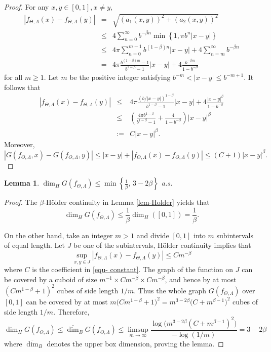 \documentclass[12pt, reqno]{amsart}
\theoremstyle{plain}
\newtheorem{lemma}{Lemma}[section]
\theoremstyle{definition}
\theoremstyle{remark}
\begin{document}
	\begin{proof}
		For any \( x, y \in [0,1], x\ne  y\),
		\begin{eqnarray*}
				|f_{\Theta,\Lambda}(x) -f_{\Theta,\Lambda}(y)| &=& \sqrt{(a_1(x,y))^2+(a_2(x,y))^2} \\				 
				&\leq& 4 \sum_{n=0}^{\infty}  b^{-\beta n} \min\left\{1, \pi b^n |x - y|\right\} \\
				&\leq& 4  \pi \sum_{n=0}^{m-1} b^{(1-\beta) n} |x - y| + 4 \sum_{n=m}^{\infty} b^{-\beta n} \\
				&=& 4\pi \frac{b^{(1-\beta) m} - 1}{b^{1-\beta} - 1} |x - y| + 4 \frac{b^{-\beta m}}{1 - b^{-\beta}}
		\end{eqnarray*}
		for all \( m \ge 1 \).  Let \( m \) be the positive integer satisfying \( b^{-m} < |x - y| \leq b^{-m+1} \). It follows that
		\begin{eqnarray}\label{equ- constant}
			|f_{\Theta,\Lambda}(x) -f_{\Theta,\Lambda}(y)| &\leq& 4\pi \frac{(b / |x - y|)^{1-\beta}}{b^{1-\beta} - 1} |x - y| + 4\frac{|x - y|^{\beta}}{1 - b^{-\beta}} \nonumber \\
				&\leq& \left( \frac{4\pi b^{1-\beta}}{b^{1-\beta} - 1} + \frac{4}{1 - b^{-\beta}} \right) |x - y|^{\beta} \nonumber \\
				&:=& C |x - y|^{\beta}. 
		\end{eqnarray}		
		Moreover, $$|G(f_{\Theta,\Lambda},x)-G(f_{\Theta,\Lambda},y)|\le|x-y|+|f_{\Theta,\Lambda}(x) -f_{\Theta,\Lambda}(y)|\le (C+1)|x-y|^\beta.$$		
	\end{proof}
	

	
	\begin{lemma}\label{lem-lowerbound}
		$\dim_H G(f_{\Theta,\Lambda})\le \min\left\{\frac{1}{\beta}, \, 3-2\beta\right\}$ a.s.
	\end{lemma}
	
	\begin{proof}
	The $\beta$-H\"older continuity in	Lemma \ref{lem-Holder} yields that 
	$$\dim_H G(f_{\Theta,\Lambda})\le \frac{1}{\beta} \dim_H([0,1])=\frac{1}{\beta}.$$
		
	On the other hand,	take an integer \( m>1 \) and divide \( [0,1] \) into \( m \) subintervals of equal length. Let $J$ be one of the subintervals, H\"older continuity implies that
		\[
		\sup_{x,y\in J}|f_{\Theta,\Lambda}(x)-f_{\Theta,\Lambda}(y)| \le C m^{-\beta}
		\] where $C$ is the coefficient in \eqref{equ- constant}. 	The graph of the function on $J$ can be covered by a cuboid of size
		\( m^{-1}\times C m^{-\beta}\times C m^{-\beta} \), and hence by at most $(C m^{1-\beta} + 1)^2$ cubes of side length \( 1/m \). Thus the whole graph  $G(f_{\Theta,\Lambda})$ over $[0,1]$ can be covered by at most $m\bigl(C m^{1-\beta}+1\bigr)^2=m^{3-2\beta}\bigl(C+m^{\beta-1}\bigr)^2$
		cubes of side length \( 1/m \). Therefore,
		\[
		\dim_H G(f_{\Theta,\Lambda})
		\le \overline{\dim}_B G(f_{\Theta,\Lambda})
		\le \limsup_{m\to\infty}
		\frac{\log\bigl(m^{3-2\beta}(C+m^{\beta-1})^2\bigr)}{-\log(1/m)}
		=3-2\beta
		\] where $\overline{\dim}_B$ denotes the upper box dimension, proving the lemma.
	\end{proof}
\end{document}
